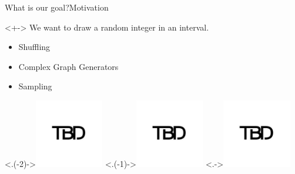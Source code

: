 \begin{frame}{What is our goal?}{Motivation}
    \pause 
    \begin{block}{}<+->
        We want to  draw a  random integer in an interval.
    \end{block}
    
    \begin{itemize}[<+->]
        \item Shuffling
        \item Complex Graph Generators
        \item Sampling
    \end{itemize}

    \smallskip

	\begin{center}
		\onslide<.(-2)->{\includegraphics[height=3cm]{img/TBD.jpg}}
		\hfil
		\onslide<.(-1)->{\includegraphics[height=3cm]{img/TBD.jpg}}
		\hfil
		\onslide<.->{\includegraphics[height=3cm]{img/TBD.jpg}}
	\end{center}
\end{frame}